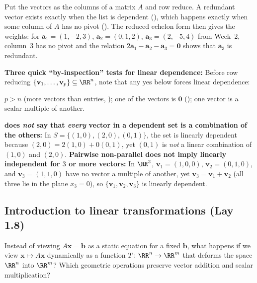 \documentclass[10pt]{scrartcl}
\newcommand{\vv}[1]{\mathbf{#1}}
\begin{document}
\revisit
Put the vectors as the columns of a matrix $A$ and row reduce. A redundant vector exists exactly when the list is dependent (), which happens exactly when some column of $A$ has no pivot (). The reduced echelon form then gives the weights: for $\vv a_1=(1,-2,3)$, $\vv a_2=(0,1,2)$, $\vv a_3=(2,-5,4)$ from Week~2, column~3 has no pivot and the relation $2\vv a_1-\vv a_2-\vv a_3=\vv 0$ shows that $\vv a_3$ is redundant.

\begin{shortcuts}
  \ii \textbf{Three quick ``by-inspection'' tests for linear dependence:} Before row reducing $\{\vv v_1,\dots,\vv v_p\}\subseteq\RR^n$, note that any yes below forces linear dependence:
  \begin{enumerate}[(1)]
    \ii $p>n$ (more vectors than entries, );
    \ii one of the vectors is $\vv 0$ ();
    \ii one vector is a scalar multiple of another.
  \end{enumerate}
\end{shortcuts}

\begin{trapbox}
  \ii \textbf{ does \emph{not} say that \emph{every} vector in a dependent set is a combination of the others:} In $S=\{(1,0),(2,0),(0,1)\}$, the set is linearly dependent because $(2,0)=2(1,0)+0(0,1)$, yet $(0,1)$ is \emph{not} a linear combination of $(1,0)$ and $(2,0)$.
  \ii \textbf{Pairwise non-parallel does not imply linearly independent for $3$ or more vectors:} In $\RR^3$, $\vv v_1=(1,0,0)$, $\vv v_2=(0,1,0)$, and $\vv v_3=(1,1,0)$ have no vector a multiple of another, yet $\vv v_3=\vv v_1+\vv v_2$ (all three lie in the plane $x_3=0$), so $\{\vv v_1,\vv v_2,\vv v_3\}$ is linearly dependent.
\end{trapbox}

\subsection{Introduction to linear transformations (Lay 1.8)}

\begin{qbox}
  Instead of viewing $A\vv x=\vv b$ as a static equation for a fixed $\vv b$, what happens if we view $\vv x\mapsto A\vv x$ dynamically as a function $T\colon\RR^n\to\RR^m$ that deforms the space $\RR^n$ into $\RR^m$? Which geometric operations preserve vector addition and scalar multiplication?
\end{qbox}
\end{document}
